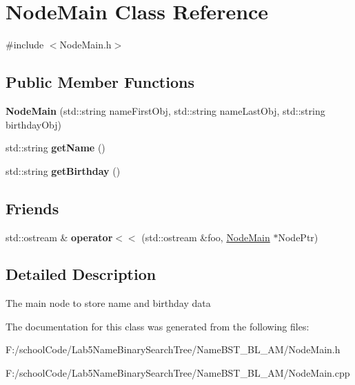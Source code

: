 \hypertarget{class_node_main}{}\section{Node\+Main Class Reference}
\label{class_node_main}


{\ttfamily \#include $<$Node\+Main.\+h$>$}

\subsection*{Public Member Functions}
\begin{DoxyCompactItemize}
\item 
\mbox{\label{class_node_main_a61c13db0781ce67d40c980dc5e5167e8}} 
{\bfseries Node\+Main} (std\+::string name\+First\+Obj, std\+::string name\+Last\+Obj, std\+::string birthday\+Obj)
\item 
\mbox{\label{class_node_main_ab2a322039546740a6ee4dc889c1af6ce}} 
std\+::string {\bfseries get\+Name} ()
\item 
\mbox{\label{class_node_main_a92b3f0b8de146421da6067f5272135d8}} 
std\+::string {\bfseries get\+Birthday} ()
\end{DoxyCompactItemize}
\subsection*{Friends}
\begin{DoxyCompactItemize}
\item 
\mbox{\label{class_node_main_a08a4c89d1f32549a5932c7f355e54759}} 
std\+::ostream \& {\bfseries operator$<$$<$} (std\+::ostream \&foo, \hyperlink{class_node_main}{Node\+Main} $\ast$Node\+Ptr)
\end{DoxyCompactItemize}


\subsection{Detailed Description}
The main node to store name and birthday data 

The documentation for this class was generated from the following files\+:\begin{DoxyCompactItemize}
\item 
F\+:/school\+Code/\+Lab5\+Name\+Binary\+Search\+Tree/\+Name\+B\+S\+T\+\_\+\+B\+L\+\_\+\+A\+M/Node\+Main.\+h\item 
F\+:/school\+Code/\+Lab5\+Name\+Binary\+Search\+Tree/\+Name\+B\+S\+T\+\_\+\+B\+L\+\_\+\+A\+M/Node\+Main.\+cpp\end{DoxyCompactItemize}

